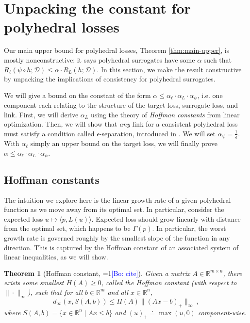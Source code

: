 \documentclass{article}
\newtheorem{theorem}{Theorem}
\theoremstyle{definition}\newtheorem{definition}{Definition}
\theoremstyle{definition}\newtheorem{assumption}{Assumption}
\newcommand{\Comments}{1}
\newcommand{\mynote}[2]{\ifnum\Comments=1\textcolor{#1}{#2}\fi}
\newcommand{\bo}[1]{\mynote{blue}{[Bo: #1]}}
\newcommand{\reals}{\mathbb{R}}
\newcommand{\defeq}{\doteq}%
\newcommand{\D}{\mathcal{D}}
\newcommand{\inprod}[2]{\langle #1, #2 \rangle}%
\begin{document}
\section{Unpacking the constant for polyhedral losses} \label{sec:constant}

Our main upper bound for polyhedral losses, Theorem \ref{thm:main-upper}, is mostly nonconstructive: it says polyhedral surrogates have some $\alpha$ such that $R_{\ell}(\psi \circ h; \D) \leq \alpha \cdot R_L(h;\D)$.
In this section, we make the result constructive by unpacking the implications of consistency for polyhedral surrogates.

We will give a bound on the constant of the form $\alpha \leq \alpha_{\ell} \cdot \alpha_L \cdot \alpha_{\psi}$, i.e. one component each relating to the structure of the target loss, surrogate loss, and link.
First, we will derive $\alpha_L$ using the theory of \emph{Hoffman constants} from linear optimization.
Then, we will show that \emph{any} link for a consistent polyhedral loss must satisfy a condition called $\epsilon$-separation, introduced in \cite{finocchiaro2020embedding}.
We will set $\alpha_{\psi} = \frac{1}{\epsilon}$.
With $\alpha_{\ell}$ simply an upper bound on the target loss, we will finally prove $\alpha \leq \alpha_{\ell} \cdot \alpha_L \cdot \alpha_{\psi}$.

\subsection{Hoffman constants}
The intuition we explore here is the linear growth rate of a given polyhedral function as we move away from its optimal set.
In particular, consider the expected loss $u \mapsto \inprod{p}{L(u)}$.
Expected loss should grow linearly with distance from the optimal set, which happens to be $\Gamma(p)$.
In particular, the worst growth rate is governed roughly by the smallest slope of the function in any direction.
This is captured by the Hoffman constant of an associated system of linear inequalities, as we will show.

\begin{theorem}[Hoffman constant, \bo{cite}]
  \label{thm:hoffman}
  Given a matrix $A\in\reals^{m\times n}$, there exists some smallest $H(A)\geq 0$, called the \emph{Hoffman constant} (with respect to $\|\cdot\|_\infty$), such that for all $b\in\reals^m$ and all $x\in\reals^n$,
  \begin{equation}
    \label{eq:hoffman}
    d_\infty(x,S(A,b)) \leq H(A) \|(A x - b)_+\|_\infty~,
  \end{equation}
  where $S(A,b) = \{x\in\reals^n \mid A x \leq b\}$ and $(u)_+ \defeq \max(u,0)$ component-wise.
\end{theorem}
\end{document}
